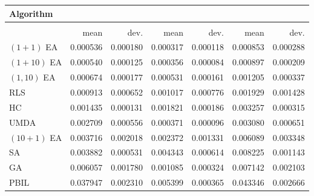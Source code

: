 \begin{tabular}{@{} l *{6}{>{{}}N{1}{2}} @{}}
\toprule
{Algorithm} &  \\
\midrule
&  &  &  \\
\midrule
& {mean} & {dev.} & {mean} & {dev.} & {mean} & {dev.} \\
\midrule
$(1+1)$ EA & 0.000536 & 0.000180 & 0.000317 & 0.000118 & 0.000853 & 0.000288 \\
$(1+10)$ EA & 0.000540 & 0.000125 & 0.000356 & 0.000084 & 0.000897 & 0.000209 \\
$(1,10)$ EA & 0.000674 & 0.000177 & 0.000531 & 0.000161 & 0.001205 & 0.000337 \\
RLS & 0.000913 & 0.000652 & 0.001017 & 0.000776 & 0.001929 & 0.001428 \\
HC & 0.001435 & 0.000131 & 0.001821 & 0.000186 & 0.003257 & 0.000315 \\
UMDA & 0.002709 & 0.000556 & 0.000371 & 0.000096 & 0.003080 & 0.000651 \\
$(10+1)$ EA & 0.003716 & 0.002018 & 0.002372 & 0.001331 & 0.006089 & 0.003348 \\
SA & 0.003882 & 0.000531 & 0.004343 & 0.000614 & 0.008225 & 0.001143 \\
GA & 0.006057 & 0.001780 & 0.001085 & 0.000324 & 0.007142 & 0.002103 \\
PBIL & 0.037947 & 0.002310 & 0.005399 & 0.000365 & 0.043346 & 0.002666 \\
\bottomrule
\end{tabular}
